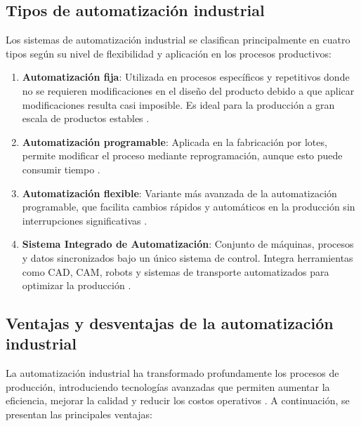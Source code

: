 \newpage

\subsection{Tipos de automatización industrial}

Los sistemas de automatización industrial se clasifican principalmente en cuatro tipos según su nivel de flexibilidad y aplicación en los procesos productivos:

\begin{enumerate}
    \item \textbf{Automatización fija}: Utilizada en procesos específicos y repetitivos donde no se requieren modificaciones en el diseño del producto debido a que aplicar modificaciones resulta casi imposible. Es ideal para la producción a gran escala de productos estables \cite{tipos_industrial}.
    \item \textbf{Automatización programable}: Aplicada en la fabricación por lotes, permite modificar el proceso mediante reprogramación, aunque esto puede consumir tiempo \cite{tipos_industrial}.
    \item \textbf{Automatización flexible}: Variante más avanzada de la automatización programable, que facilita cambios rápidos y automáticos en la producción sin interrupciones significativas \cite{tipos_industrial}.
    \newpage
    \item \textbf{Sistema Integrado de Automatización}: Conjunto de máquinas, procesos y datos sincronizados bajo un único sistema de control. Integra herramientas como CAD, CAM, robots y sistemas de transporte automatizados para optimizar la producción \cite{tipos_industrial}.
\end{enumerate}

\subsection{Ventajas y desventajas de la automatización industrial}

La automatización industrial ha transformado profundamente los procesos de producción, introduciendo tecnologías avanzadas que permiten aumentar la eficiencia, mejorar la calidad y reducir los costos operativos \cite{des_ventajas_1}. A continuación, se presentan las principales ventajas:

